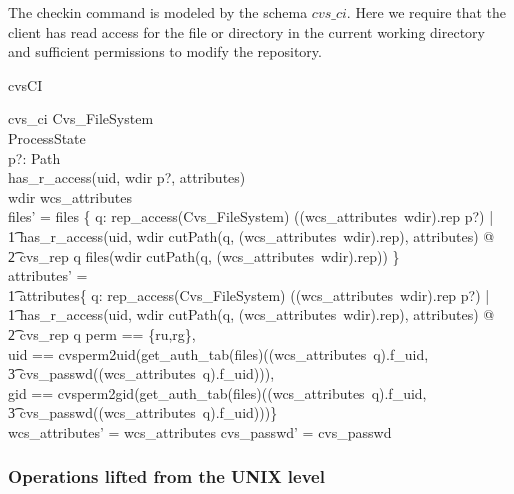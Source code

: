 The checkin command is modeled by the schema $cvs\_ci$.  Here we require that
the client has read access for the file or directory in the current working
directory and sufficient permissions to modify the repository.
\begin{doc}{cvsCI}
  \begin{schema}{cvs\_ci}
    \Delta Cvs\_FileSystem\\
    \Xi ProcessState \\
    p?: Path \\
    \where
    has\_r\_access(uid, wdir \cat p?, attributes) \\
    wdir \in \dom wcs\_attributes \\
    
    files' = files \oplus \{ q: rep\_access(\theta Cvs\_FileSystem)
    ((wcs\_attributes~wdir).rep \cat p?) | \\ 
    \t1 has\_r\_access(uid, wdir \cat cutPath(q, (wcs\_attributes~wdir).rep),
    attributes) @ \\ 
    \t2 cvs\_rep \cat q \mapsto files(wdir \cat cutPath(q,
    (wcs\_attributes~wdir).rep)) \} \\ 

    attributes' = \\
    \t1 attributes\oplus\{ q: rep\_access(\theta Cvs\_FileSystem)
    ((wcs\_attributes~wdir).rep \cat p?) | \\
    \t1 has\_r\_access(uid, wdir \cat cutPath(q, (wcs\_attributes~wdir).rep),
    attributes) @ \\ 
    \t2 cvs\_rep \cat q \mapsto \< \lblot  perm == \{ru,rg\}, \\
    uid == cvsperm2uid(get\_auth\_tab(files)((wcs\_attributes~q).f\_uid, \\
    \t3 cvs\_passwd((wcs\_attributes~q).f\_uid))), \\
    gid == cvsperm2gid(get\_auth\_tab(files)((wcs\_attributes~q).f\_uid, \\
    \t3 cvs\_passwd((wcs\_attributes~q).f\_uid)))\rblot \} \> \\
    
    wcs\_attributes' = wcs\_attributes \land cvs\_passwd' = cvs\_passwd \\ 
  \end{schema}
\end{doc}


\subsubsection{Operations lifted from the UNIX level}

